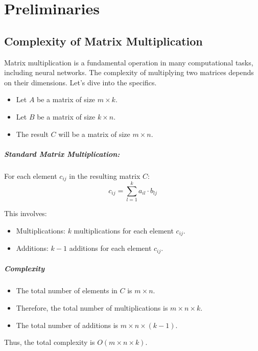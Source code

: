 \chapter{Preliminaries}

\section{Complexity of Matrix Multiplication}

Matrix multiplication is a fundamental operation in many computational tasks, including neural networks. The complexity of multiplying two matrices depends on their dimensions. Let's dive into the specifics.

\begin{itemize}
	\item Let \(A\) be a matrix of size \(m \times k\).
	\item Let \(B\) be a matrix of size \(k \times n\).
	\item The result \(C\) will be a matrix of size \(m \times n\).
\end{itemize}

\paragraph{Standard Matrix Multiplication:} For each element \(c_{ij}\) in the resulting matrix \(C\):
\[ c_{ij} = \sum_{l=1}^{k} a_{il} \cdot b_{lj} \]

This involves:
\begin{itemize}
	\item Multiplications: \(k\) multiplications for each element \(c_{ij}\).
	\item Additions: \(k-1\) additions for each element \(c_{ij}\).
\end{itemize}

\paragraph{Complexity}
\begin{itemize}
	\item The total number of elements in \(C\) is \(m \times n\).
	\item Therefore, the total number of multiplications is \(m \times n \times k\).
	\item The total number of additions is \(m \times n \times (k-1)\).
\end{itemize}

Thus, the total complexity is \(O(m \times n \times k)\).

